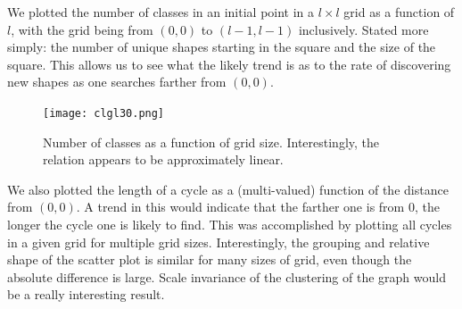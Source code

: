 \documentclass{article}
\begin{document}
We plotted the number of classes in an initial point in a $l \times l$ grid as a function of $l$, with the grid being from $(0,0)$ to $(l-1,l-1)$ inclusively. Stated more simply: the number of unique shapes starting in the square and the size of the square. This allows us to see what the likely trend is as to the rate of discovering new shapes as one searches farther from $(0,0)$.

\begin{figure}[H]
\center
\texttt{[image: clgl30.png]}
\caption{Number of classes as a function of grid size. Interestingly, the relation appears to be approximately linear.}
\end{figure}

We also plotted the length of a cycle as a (multi-valued) function of the distance from $(0,0)$. A trend in this would indicate that the farther one is from $0$, the longer the cycle one is likely to find. This was accomplished by plotting all cycles in a given grid for multiple grid sizes. Interestingly, the grouping and relative shape of the scatter plot is similar for many sizes of grid, even though the absolute difference is large. Scale invariance of the clustering of the graph would be a really interesting result.
\end{document}
